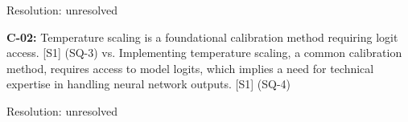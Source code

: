 \documentclass[a4paper,11pt]{article}
\begin{document}
Resolution: unresolved


\textbf{C-02:} Temperature scaling is a foundational calibration method requiring logit access. \textcolor{primary}{[S1]} (SQ-3) vs. Implementing temperature scaling, a common calibration method, requires access to model logits, which implies a need for technical expertise in handling neural network outputs. \textcolor{primary}{[S1]} (SQ-4)

Resolution: unresolved
\end{document}
